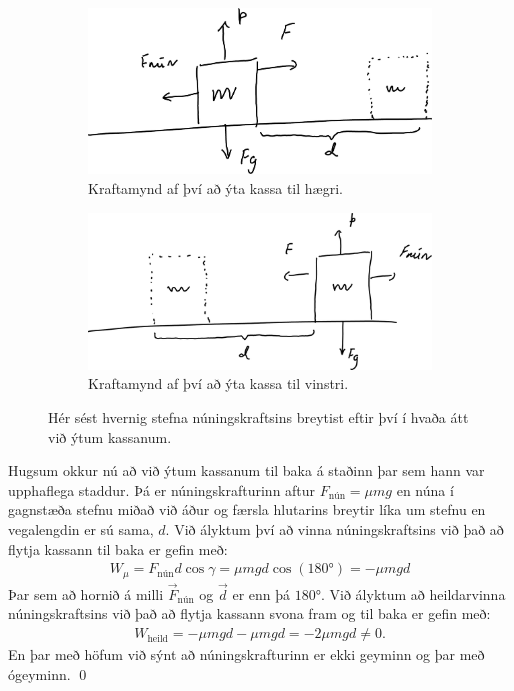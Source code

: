 \begin{figure}[H]
    \centering
\begin{subfigure}[h]{.45\textwidth}
    \centering
    \includegraphics[width=\linewidth]{temp/worknun2.pdf}
    \caption{Kraftamynd af því að ýta kassa til hægri.}
    \label{fig:nunright}
\end{subfigure}
\hfill
\begin{subfigure}[h]{.45\textwidth}
    \centering
    \includegraphics[width=\linewidth]{temp/worknun.pdf}
    \caption{Kraftamynd af því að ýta kassa til vinstri.}
    \label{fig:nunleft}
\end{subfigure}
\caption{Hér sést hvernig stefna núningskraftsins breytist eftir því í hvaða átt við ýtum kassanum.}
\end{figure}

Hugsum okkur nú að við ýtum kassanum til baka á staðinn þar sem hann var upphaflega staddur. Þá er núningskrafturinn aftur $F_{\text{nún}} = \mu mg$ en núna í gagnstæða stefnu miðað við áður og færsla hlutarins breytir líka um stefnu en vegalengdin er sú sama, $d$. Við ályktum því að vinna núningskraftsins við það að flytja kassann til baka er gefin með:
\begin{align*}
    W_\mu = F_{\text{nún}} d \cos\gamma = \mu mg d \cos(\ang{180}) = -\mu mg d
\end{align*}
Þar sem að hornið á milli $\vec{F}_{\text{nún}}$ og $\vec{d}$ er enn þá $\ang{180}$. Við ályktum að heildarvinna núningskraftsins við það að flytja kassann svona fram og til baka er gefin með:
\begin{align*}
    W_{\text{heild}} = -\mu mgd  - \mu mgd = -2\mu mgd \neq 0.
\end{align*}
En þar með höfum við sýnt að núningskrafturinn er ekki geyminn og þar með ógeyminn. \qed


